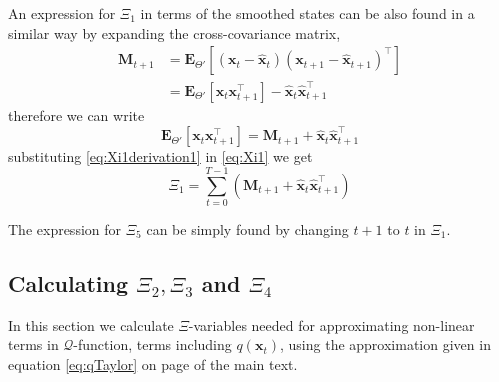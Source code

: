 \documentclass[]{article}
\begin{document}
An expression for $\Xi_1$ in terms of the smoothed states can be also found in a similar way by expanding the cross-covariance matrix,
\begin{align}
 \mathbf M_{t+1}&=\mathbf E_{\Theta'}\left[(\mathbf x_t-\mathbf{\hat x}_t)(\mathbf x_{t+1}-\mathbf{\hat x}_{t+1})^\top\right] \nonumber \\
&=\mathbf E_{\Theta'}\left[\mathbf x_t\mathbf x_{t+1}^\top\right]-\mathbf {\hat x}_t\mathbf{\hat x}_{t+1}^\top
\end{align}
therefore we can write
\begin{equation}\label{eq:Xi1derivation1}
 \mathbf E_{\Theta'}\left[\mathbf x_t\mathbf x_{t+1}^\top\right]=\mathbf M_{t+1}+\mathbf {\hat x}_t\mathbf{\hat x}_{t+1}^\top
\end{equation}
substituting \ref{eq:Xi1derivation1} in \ref{eq:Xi1} we get
\begin{equation}
 \Xi_1=\sum_{t=0}^{T-1}\left(\mathbf M_{t+1}+\mathbf{\hat x}_t\mathbf{\hat x}_{t+1}^\top\right)
\end{equation}


 The expression for $\Xi_5$ can be simply found by changing $t+1$ to $t$ in $\Xi_1$.

\subsection*{Calculating $\Xi_{2},\Xi_{3}$ and $\Xi_{4}$}
In this section we calculate $\Xi$-variables needed for approximating non-linear terms in $\mathcal{Q}$-function, terms including $q\left(\mathbf x_t\right)$, using the approximation given in equation \ref{eq:qTaylor} on page \pageref{eq:qTaylor} of the main text.
\end{document}
